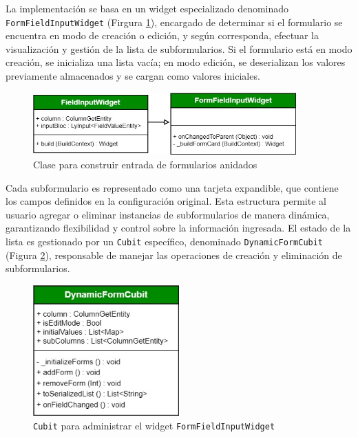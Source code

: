 \documentclass[12pt, a4paper]{book}
\begin{document}
La implementación se basa en un widget especializado denominado \texttt{FormFieldInputWidget} (Firgura \ref{fig:forminput}), encargado de determinar si el formulario se encuentra en modo de creación o edición, y según corresponda, efectuar la visualización y gestión de la lista de subformularios. Si el formulario está en modo creación, se inicializa una lista vacía; en modo edición, se deserializan los valores previamente almacenados y se cargan como valores iniciales.

\begin{figure}[H]
  \centering
  \includegraphics[width=0.9\textwidth]{images/form_field_input.jpg}
  \caption{Clase para construir entrada de formularios anidados}
  \label{fig:forminput}
\end{figure}

Cada subformulario es representado como una tarjeta expandible, que contiene los campos definidos en la configuración original. Esta estructura permite al usuario agregar o eliminar instancias de subformularios de manera dinámica, garantizando flexibilidad y control sobre la información ingresada. El estado de la lista es gestionado por un \texttt{Cubit} específico, denominado \texttt{DynamicFormCubit} (Figura \ref{fig:dynamicformlist}), responsable de manejar las operaciones de creación y eliminación de subformularios.

\begin{figure}[H]
  \centering
  \includegraphics[width=0.5\textwidth]{images/dynamic_form_list.jpg}
  \caption{\texttt{Cubit} para administrar el widget \texttt{FormFieldInputWidget}}
  \label{fig:dynamicformlist}
\end{figure}
\end{document}
